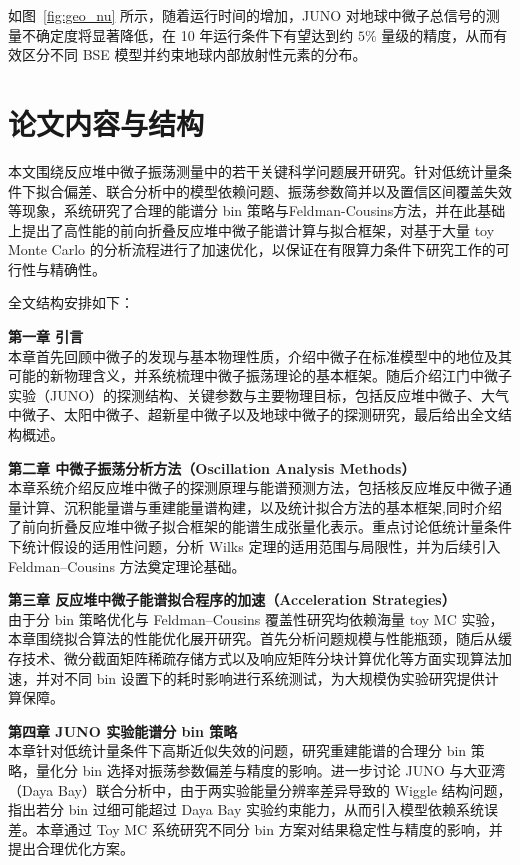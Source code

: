 如图~\ref{fig:geo_nu} 所示，随着运行时间的增加，JUNO 对地球中微子总信号的测量不确定度将显著降低，在 10 年运行条件下有望达到约 $5\%$ 量级的精度，从而有效区分不同 BSE 模型并约束地球内部放射性元素的分布。

\section{论文内容与结构}

本文围绕反应堆中微子振荡测量中的若干关键科学问题展开研究。针对低统计量条件下拟合偏差、联合分析中的模型依赖问题、振荡参数简并以及置信区间覆盖失效等现象，系统研究了合理的能谱分 bin 策略与Feldman-Cousins方法，并在此基础上提出了高性能的前向折叠反应堆中微子能谱计算与拟合框架，对基于大量 toy Monte Carlo 的分析流程进行了加速优化，以保证在有限算力条件下研究工作的可行性与精确性。

全文结构安排如下：

\textbf{第一章 引言}\\
\hspace*{2em}本章首先回顾中微子的发现与基本物理性质，介绍中微子在标准模型中的地位及其可能的新物理含义，并系统梳理中微子振荡理论的基本框架。随后介绍江门中微子实验（JUNO）的探测结构、关键参数与主要物理目标，包括反应堆中微子、大气中微子、太阳中微子、超新星中微子以及地球中微子的探测研究，最后给出全文结构概述。

\textbf{第二章 中微子振荡分析方法（Oscillation Analysis Methods）}\\
\hspace*{2em}本章系统介绍反应堆中微子的探测原理与能谱预测方法，包括核反应堆反中微子通量计算、沉积能量谱与重建能量谱构建，以及统计拟合方法的基本框架,同时介绍了前向折叠反应堆中微子拟合框架的能谱生成张量化表示。重点讨论低统计量条件下统计假设的适用性问题，分析 Wilks 定理的适用范围与局限性，并为后续引入 Feldman–Cousins 方法奠定理论基础。

\textbf{第三章 反应堆中微子能谱拟合程序的加速（Acceleration Strategies）}\\
\hspace*{2em}由于分 bin 策略优化与 Feldman–Cousins 覆盖性研究均依赖海量 toy MC 实验，本章围绕拟合算法的性能优化展开研究。首先分析问题规模与性能瓶颈，随后从缓存技术、微分截面矩阵稀疏存储方式以及响应矩阵分块计算优化等方面实现算法加速，并对不同 bin 设置下的耗时影响进行系统测试，为大规模伪实验研究提供计算保障。

\textbf{第四章 JUNO 实验能谱分 bin 策略}\\
\hspace*{2em}本章针对低统计量条件下高斯近似失效的问题，研究重建能谱的合理分 bin 策略，量化分 bin 选择对振荡参数偏差与精度的影响。进一步讨论 JUNO 与大亚湾（Daya Bay）联合分析中，由于两实验能量分辨率差异导致的 Wiggle 结构问题，指出若分 bin 过细可能超过 Daya Bay 实验约束能力，从而引入模型依赖系统误差。本章通过 Toy MC 系统研究不同分 bin 方案对结果稳定性与精度的影响，并提出合理优化方案。

